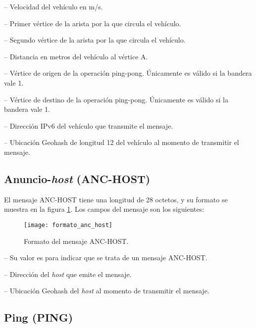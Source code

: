  -- Velocidad del vehículo en m/s.

 -- Primer vértice de la arista por la que
circula el vehículo.

 -- Segundo vértice de la arista por la que
circula el vehículo.

 -- Distancia en metros del vehículo al vértice
A.

 -- Vértice de origen de la operación ping-pong.
Únicamente es válido si la bandera  vale 1.

 -- Vértice de destino de la operación ping-pong.
Únicamente es válido si la bandera  vale 1.

 -- Dirección IPv6 del vehículo que
transmite el mensaje.

 -- Ubicación Geohash de longitud 12 del
vehículo al momento de transmitir el mensaje.

\subsection{Anuncio-\textit{host} (ANC-HOST)}

\label{subsec:mensaje_anuncio_host}

El mensaje ANC-HOST tiene una longitud de 28 octetos, y su formato se muestra
en la figura \ref{fig:formato_anc_host}. Los campos del mensaje son los
siguientes:

\begin{figure}[th!]
\centering
\texttt{[image: formato\_anc\_host]}
\decoRule
\caption[Formato del mensaje ANC-HOST]{Formato del mensaje ANC-HOST.}
\label{fig:formato_anc_host}
\end{figure}

 -- Su valor es  para indicar que se trata de un
mensaje ANC-HOST.

 -- Dirección del \textit{host} que emite el
mensaje.

 -- Ubicación Geohash del \textit{host} al
momento de transmitir el mensaje.

\subsection{Ping (PING)}

